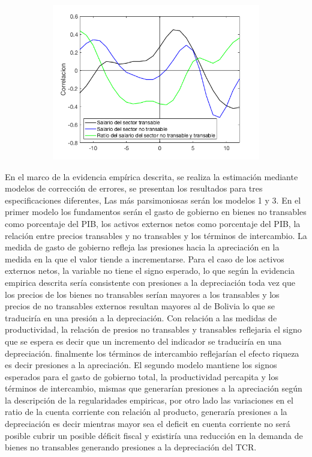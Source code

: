 \documentclass[12pt,letterpaper]{article}
\begin{document}
\begin{figure}
   \begin{subfigure}[b]{0.48\textwidth}
       \includegraphics[width=\textwidth]{fig18}
    \end{subfigure}
\end{figure}

En el marco de la evidencia empírica descrita, se realiza la estimación mediante modelos de corrección de errores, se presentan los resultados para tres especificaciones diferentes, Las más parsimoniosas serán los modelos 1 y 3. En el primer modelo los fundamentos serán el gasto de gobierno en bienes no transables como porcentaje del PIB, los activos externos netos como porcentaje del PIB, la relación entre precios transables y no transables y los términos de intercambio.
La medida de gasto de gobierno refleja las presiones hacia la apreciación en la medida en la que el valor tiende a incrementarse. Para el caso de los activos externos netos, la variable no tiene el signo esperado, lo que según la evidencia empirica descrita sería consistente con presiones a la depreciación toda vez que los precios de los bienes no transables serían mayores a los transables y los precios de no transables externos resultan mayores al de Bolivia lo que se traduciría en una presión a la depreciación. 
Con relación a las medidas de productividad, la relación de presios no transables y transables reflejaria el signo que se espera es decir que un incremento del indicador se traduciría en una depreciación. finalmente los términos de intercambio reflejarían el efecto riqueza es decir presiones a la apreciación. 
El segundo modelo mantiene los signos esperados para el gasto de gobierno total, la productividad percapita y los términos de intercambio, mismas que generarían presiones a la apreciación según la descripción de la regularidades empiricas, por otro lado las variaciones en el ratio de la cuenta corriente con relación al producto, generaría presiones a la depreciación es decir mientras mayor sea el deficit en cuenta corriente no será posible cubrir un posible déficit fiscal y existiría una reducción en la demanda de bienes no transables generando presiones a la depreciación del TCR. 
\end{document}
